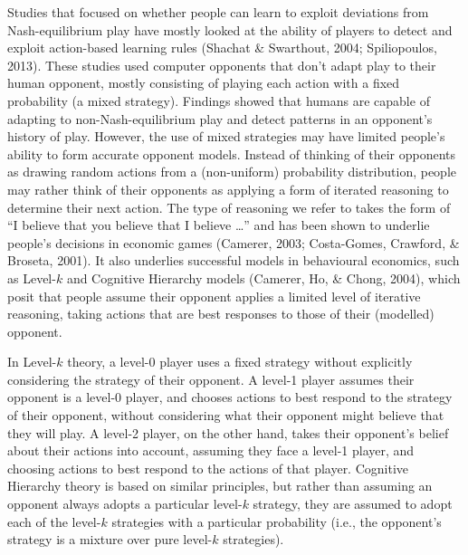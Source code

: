 \documentclass[man,floatsintext]{apa6}
\begin{document}
Studies that focused on whether people can learn to exploit deviations from Nash-equilibrium play have mostly looked at the ability of players to detect and exploit action-based learning rules (Shachat \& Swarthout, 2004; Spiliopoulos, 2013). These studies used computer opponents that don't adapt play to their human opponent, mostly consisting of playing each action with a fixed probability (a mixed strategy). Findings showed that humans are capable of adapting to non-Nash-equilibrium play and detect patterns in an opponent's history of play. However, the use of mixed strategies may have limited people's ability to form accurate opponent models.
Instead of thinking of their opponents as drawing random actions from a (non-uniform) probability distribution, people may rather think of their opponents as applying a form of iterated reasoning to determine their next action. The type of reasoning we refer to takes the form of \enquote{I believe that you believe that I believe \ldots{}} and has been shown to underlie people's decisions in economic games (Camerer, 2003; Costa-Gomes, Crawford, \& Broseta, 2001). It also underlies successful models in behavioural economics, such as Level-\(k\) and Cognitive Hierarchy models (Camerer, Ho, \& Chong, 2004), which posit that people assume their opponent applies a limited level of iterative reasoning, taking actions that are best responses to those of their (modelled) opponent.

In Level-\(k\) theory, a level-0 player uses a fixed strategy without explicitly considering the strategy of their opponent. A level-1 player assumes their opponent is a level-0 player, and chooses actions to best respond to the strategy of their opponent, without considering what their opponent might believe that they will play. A level-2 player, on the other hand, takes their opponent's belief about their actions into account, assuming they face a level-1 player, and choosing actions to best respond to the actions of that player. Cognitive Hierarchy theory is based on similar principles, but rather than assuming an opponent always adopts a particular level-\(k\) strategy, they are assumed to adopt each of the level-\(k\) strategies with a particular probability (i.e., the opponent's strategy is a mixture over pure level-\(k\) strategies).
\end{document}
